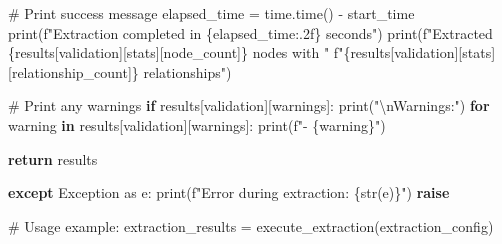 \documentclass[
  11pt,
  letterpaper,
]{book}
\newenvironment{Shaded}{\begin{snugshade}}{\end{snugshade}}
\newcommand{\BuiltInTok}[1]{\textcolor[rgb]{0.00,0.23,0.31}{#1}}
\newcommand{\CharTok}[1]{\textcolor[rgb]{0.13,0.47,0.30}{#1}}
\newcommand{\CommentTok}[1]{\textcolor[rgb]{0.37,0.37,0.37}{#1}}
\newcommand{\ControlFlowTok}[1]{\textcolor[rgb]{0.00,0.23,0.31}{\textbf{#1}}}
\newcommand{\ImportTok}[1]{\textcolor[rgb]{0.00,0.46,0.62}{#1}}
\newcommand{\KeywordTok}[1]{\textcolor[rgb]{0.00,0.23,0.31}{\textbf{#1}}}
\newcommand{\NormalTok}[1]{\textcolor[rgb]{0.00,0.23,0.31}{#1}}
\newcommand{\OperatorTok}[1]{\textcolor[rgb]{0.37,0.37,0.37}{#1}}
\newcommand{\PreprocessorTok}[1]{\textcolor[rgb]{0.68,0.00,0.00}{#1}}
\newcommand{\SpecialCharTok}[1]{\textcolor[rgb]{0.37,0.37,0.37}{#1}}
\newcommand{\SpecialStringTok}[1]{\textcolor[rgb]{0.13,0.47,0.30}{#1}}
\newcommand{\StringTok}[1]{\textcolor[rgb]{0.13,0.47,0.30}{#1}}
\begin{document}
\begin{Shaded}
\begin{Highlighting}[]
        \CommentTok{\# Print success message}
\NormalTok{        elapsed\_time }\OperatorTok{=}\NormalTok{ time.time() }\OperatorTok{{-}}\NormalTok{ start\_time}
        \BuiltInTok{print}\NormalTok{(}\SpecialStringTok{f"Extraction completed in }\SpecialCharTok{\{}\NormalTok{elapsed\_time}\SpecialCharTok{:.2f\}}\SpecialStringTok{ seconds"}\NormalTok{)}
        \BuiltInTok{print}\NormalTok{(}\SpecialStringTok{f"Extracted }\SpecialCharTok{\{}\NormalTok{results[}\StringTok{\textquotesingle{}validation\textquotesingle{}}\NormalTok{][}\StringTok{\textquotesingle{}stats\textquotesingle{}}\NormalTok{][}\StringTok{\textquotesingle{}node\_count\textquotesingle{}}\NormalTok{]}\SpecialCharTok{\}}\SpecialStringTok{ nodes with "}
              \SpecialStringTok{f"}\SpecialCharTok{\{}\NormalTok{results[}\StringTok{\textquotesingle{}validation\textquotesingle{}}\NormalTok{][}\StringTok{\textquotesingle{}stats\textquotesingle{}}\NormalTok{][}\StringTok{\textquotesingle{}relationship\_count\textquotesingle{}}\NormalTok{]}\SpecialCharTok{\}}\SpecialStringTok{ relationships"}\NormalTok{)}

        \CommentTok{\# Print any warnings}
        \ControlFlowTok{if}\NormalTok{ results[}\StringTok{\textquotesingle{}validation\textquotesingle{}}\NormalTok{][}\StringTok{\textquotesingle{}warnings\textquotesingle{}}\NormalTok{]:}
            \BuiltInTok{print}\NormalTok{(}\StringTok{"}\CharTok{\textbackslash{}n}\StringTok{Warnings:"}\NormalTok{)}
            \ControlFlowTok{for}\NormalTok{ warning }\KeywordTok{in}\NormalTok{ results[}\StringTok{\textquotesingle{}validation\textquotesingle{}}\NormalTok{][}\StringTok{\textquotesingle{}warnings\textquotesingle{}}\NormalTok{]:}
                \BuiltInTok{print}\NormalTok{(}\SpecialStringTok{f"{-} }\SpecialCharTok{\{}\NormalTok{warning}\SpecialCharTok{\}}\SpecialStringTok{"}\NormalTok{)}

        \ControlFlowTok{return}\NormalTok{ results}

    \ControlFlowTok{except} \PreprocessorTok{Exception} \ImportTok{as}\NormalTok{ e:}
        \BuiltInTok{print}\NormalTok{(}\SpecialStringTok{f"Error during extraction: }\SpecialCharTok{\{}\BuiltInTok{str}\NormalTok{(e)}\SpecialCharTok{\}}\SpecialStringTok{"}\NormalTok{)}
        \ControlFlowTok{raise}

\CommentTok{\# Usage example:}
\NormalTok{extraction\_results }\OperatorTok{=}\NormalTok{ execute\_extraction(extraction\_config)}
\end{Highlighting}
\end{Shaded}
\end{document}
